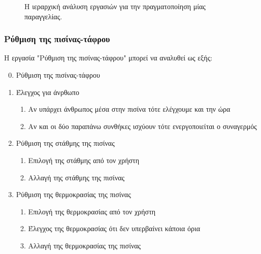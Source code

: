 \documentclass{assignment}
\begin{document}
\begin{figure}
\begin{center}
\caption{Η ιεραρχική ανάλυση εργασιών για την πραγματοποίηση μίας παραγγελίας.}
\label{fig:task_analysis:paraggelia}
\end{center}
\end{figure}

\subsubsection{Ρύθμιση της πισίνας-τάφρου}

Η εργασία "Ρύθμιση της πισίνας-τάφρου" μπορεί να αναλυθεί ως εξής:

\begin{enumerate}
\setcounter{enumi}{-1}
\item Ρύθμιση της πισίνας-τάφρου
\item Έλεγχος για άνρθωπο
  \begin{enumerate}[label*=\arabic*.]
  \item Αν υπάρχει άνθρωπος μέσα στην πισίνα τότε ελέγχουμε και την ώρα
  \item Αν και οι δύο παραπάνω συνθήκες ισχύουν τότε ενεργοποιείται ο συναγερμός 
  \end{enumerate}
\item Ρύθμιση της στάθμης της πισίνας
  \begin{enumerate}[label*=\arabic*.]
  \item Επιλογή της στάθμης από τον χρήστη
  \item Αλλαγή της στάθμης της πισίνας
  \end{enumerate}
\item Ρύθμιση της θερμοκρασίας της πισίνας
  \begin{enumerate}[label*=\arabic*.]
  \item Επιλογή της θερμοκρασίας από τον χρήστη
  \item Έλεγχος της θερμοκρασίας ότι δεν υπερβαίνει κάποια όρια
  \item Αλλαγή της θερμοκρασίας της πισίνας
  \end{enumerate}
\end{enumerate}
\end{document}
